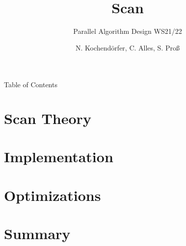 \documentclass[compress, 11pt]{beamer}
\title[Scan]{Scan}
\subtitle{Parallel Algorithm Design WS21/22}
\author{N. Kochendörfer, C. Alles, S. Proß}
\begin{document}
\frame{\titlepage}

\begin{frame}{Table of Contents}
    \tableofcontents
    
    \note{
    }
\end{frame}

\section{Scan Theory} %


\section{Implementation} %



\section{Optimizations} %
 
 




\section{Summary}

\end{document}
